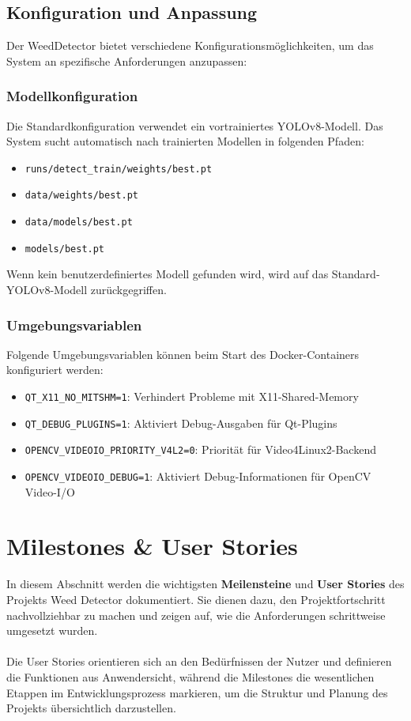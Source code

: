 \documentclass[12pt, a4paper]{scrreprt}
\begin{document}
\section{Konfiguration und Anpassung}
Der WeedDetector bietet verschiedene Konfigurationsmöglichkeiten, um das System an spezifische Anforderungen anzupassen:

\subsection{Modellkonfiguration}
Die Standardkonfiguration verwendet ein vortrainiertes YOLOv8-Modell. Das System sucht automatisch nach trainierten Modellen in folgenden Pfaden:
\begin{itemize}
    \item \texttt{runs/detect\_train/weights/best.pt}
    \item \texttt{data/weights/best.pt}
    \item \texttt{data/models/best.pt}
    \item \texttt{models/best.pt}
\end{itemize}

Wenn kein benutzerdefiniertes Modell gefunden wird, wird auf das Standard-YOLOv8-Modell zurückgegriffen.

\subsection{Umgebungsvariablen}
Folgende Umgebungsvariablen können beim Start des Docker-Containers konfiguriert werden:
\begin{itemize}
    \item \texttt{QT\_X11\_NO\_MITSHM=1}: Verhindert Probleme mit X11-Shared-Memory
    \item \texttt{QT\_DEBUG\_PLUGINS=1}: Aktiviert Debug-Ausgaben für Qt-Plugins
    \item \texttt{OPENCV\_VIDEOIO\_PRIORITY\_V4L2=0}: Priorität für Video4Linux2-Backend
    \item \texttt{OPENCV\_VIDEOIO\_DEBUG=1}: Aktiviert Debug-Informationen für OpenCV Video-I/O
\end{itemize}

\chapter{Milestones \& User Stories}
In diesem Abschnitt werden die wichtigsten \textbf{Meilensteine} und \textbf{User Stories} des Projekts Weed Detector dokumentiert. Sie dienen dazu, den Projektfortschritt nachvollziehbar zu machen und zeigen auf, wie die Anforderungen schrittweise umgesetzt wurden.\\
\\
Die User Stories orientieren sich an den Bedürfnissen der Nutzer und definieren die Funktionen aus Anwendersicht, während die Milestones die wesentlichen Etappen im Entwicklungsprozess markieren, um die Struktur und Planung des Projekts übersichtlich darzustellen.
\end{document}
